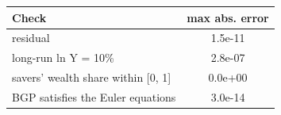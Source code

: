 \begin{tabular}{lc}\toprule Check & max abs. error\\\midrule
residual & 1.5e-11\\
long-run ln Y = 10\% & 2.8e-07\\
savers' wealth share within [0, 1] & 0.0e+00\\
BGP satisfies the Euler equations & 3.0e-14\\
\bottomrule\end{tabular}
